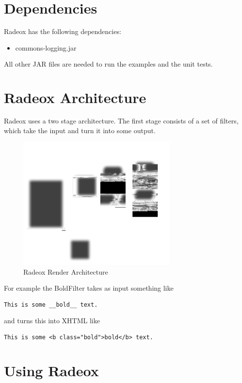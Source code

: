 \documentclass[a4paper,pdftex]{article}
\begin{document}
\section{Dependencies}
Radeox has the following dependencies:
\begin{itemize}
\item  commons-logging.jar
\end{itemize}
All other JAR files are needed to run the examples and the unit tests.

\section{Radeox Architecture}

Radeox uses a two stage architecture. The first stage consists of a set of filters, which
take the input and turn it into some output. 

\begin{figure}[ht]
  \centering
    \includegraphics[keepaspectratio,width=8cm]{images/Architecture}
     \caption{\small\textsf Radeox Render Architecture}
\end{figure}

For example the BoldFilter takes as input something like

\begin{verbatim}
This is some __bold__ text. 
\end{verbatim}

and turns this into XHTML like 

\begin{verbatim}
This is some <b class="bold">bold</b> text.
\end{verbatim}

\section{Using Radeox}
\end{document}
